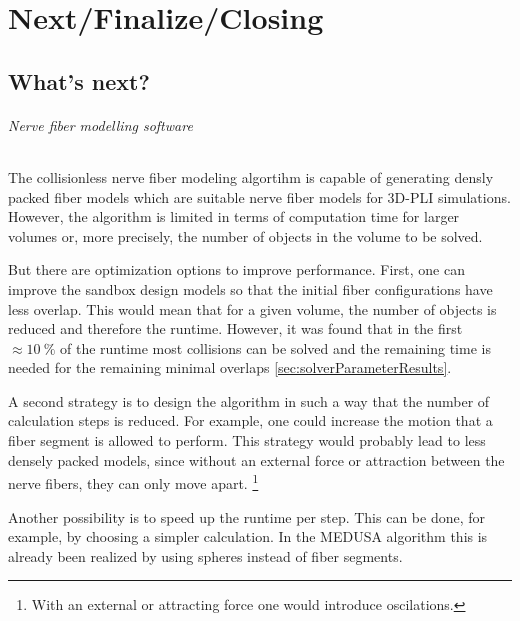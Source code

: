 \newpage\null\thispagestyle{empty}\newpage
\clearpage{\thispagestyle{empty}\cleardoublepage}
\part{Next/Finalize/Closing}
% 
% 
% 
\setcounter{chapter}{9}
\chapter{What's next?}
\label{sec:outlook}
% 
\paragraph{Nerve fiber modelling software}
% 
The collisionless nerve fiber modeling algortihm is capable of generating densly packed fiber models which are suitable nerve fiber models for \ac{3D-PLI} simulations.
However, the algorithm is limited in terms of computation time for larger volumes or, more precisely, the number of objects in the volume to be solved.
\par
% 
But there are optimization options to improve performance.
First, one can improve the sandbox design models so that the initial fiber configurations have less overlap.
This would mean that for a given volume, the number of objects is reduced and therefore the runtime.
However, it was found that in the first $\approx \SI{10}{\percent}$ of the runtime most collisions can be solved and the remaining time is needed for the remaining minimal overlaps \cref{sec:solverParameterResults}.
\par
% 
A second strategy is to design the algorithm in such a way that the number of calculation steps is reduced.
For example, one could increase the motion that a fiber segment is allowed to perform.
This strategy would probably lead to less densely packed models, since without an external force or attraction between the nerve fibers, they can only move apart. \footnote{With an external or attracting force one would introduce oscilations.}
% 
\par
Another possibility is to speed up the runtime per step.
This can be done, for example, by choosing a simpler calculation.
In the \ac{MEDUSA} algorithm this is already been realized by using spheres instead of fiber segments.
